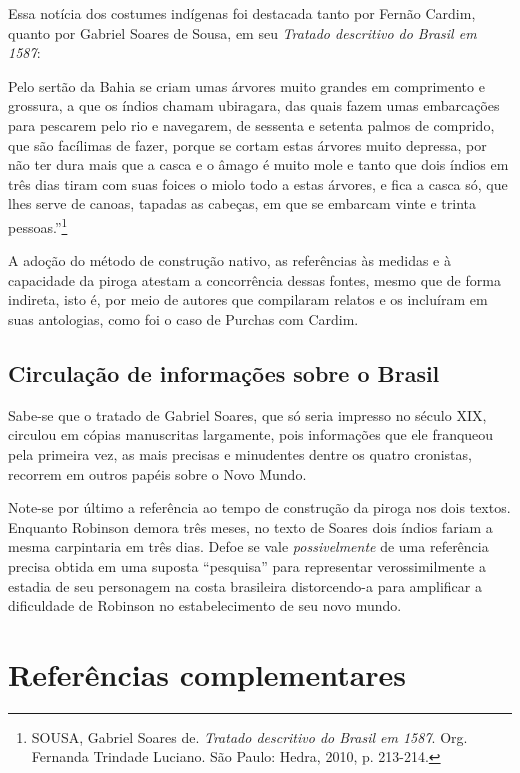 \documentclass[12pt]{extarticle}
\begin{document}
Essa notícia dos costumes indígenas foi destacada tanto por Fernão
Cardim, quanto por Gabriel Soares de Sousa, em seu \emph{Tratado
descritivo do Brasil em 1587}:

Pelo sertão da Bahia se criam umas árvores muito grandes em comprimento
e grossura, a que os índios chamam ubiragara, das quais fazem umas
embarcações para pescarem pelo rio e navegarem, de sessenta e setenta
palmos de comprido, que são facílimas de fazer, porque se cortam estas
árvores muito depressa, por não ter dura mais que a casca e o âmago é
muito mole e tanto que dois índios em três dias tiram com suas foices o
miolo todo a estas árvores, e fica a casca só, que lhes serve de canoas,
tapadas as cabeças, em que se embarcam vinte e trinta
pessoas.''\footnote{SOUSA, Gabriel Soares de. \emph{Tratado descritivo
  do Brasil em 1587}. Org. Fernanda Trindade Luciano. São Paulo: Hedra,
  2010, p. 213-214.}

A adoção do método de construção nativo, as referências às medidas e à
capacidade da piroga atestam a concorrência dessas fontes, mesmo que de
forma indireta, isto é, por meio de autores que compilaram relatos e os
incluíram em suas antologias, como foi o caso de Purchas com Cardim.

\subsection{Circulação de informações sobre o Brasil}

Sabe-se que o tratado de Gabriel Soares, que só seria impresso no século
XIX, circulou em cópias manuscritas largamente, pois informações que ele
franqueou pela primeira vez, as mais precisas e minudentes dentre os
quatro cronistas, recorrem em outros papéis sobre o Novo Mundo.

Note-se por último a referência ao tempo de construção da piroga nos
dois textos. Enquanto Robinson demora três meses, no texto de Soares
dois índios fariam a mesma carpintaria em três dias. Defoe se vale
\emph{possivelmente} de uma referência precisa obtida em uma suposta
``pesquisa'' para representar verossimilmente a estadia de seu
personagem na costa brasileira distorcendo-a para amplificar a
dificuldade de Robinson no estabelecimento de seu novo mundo.



\section{Referências complementares}
\end{document}
